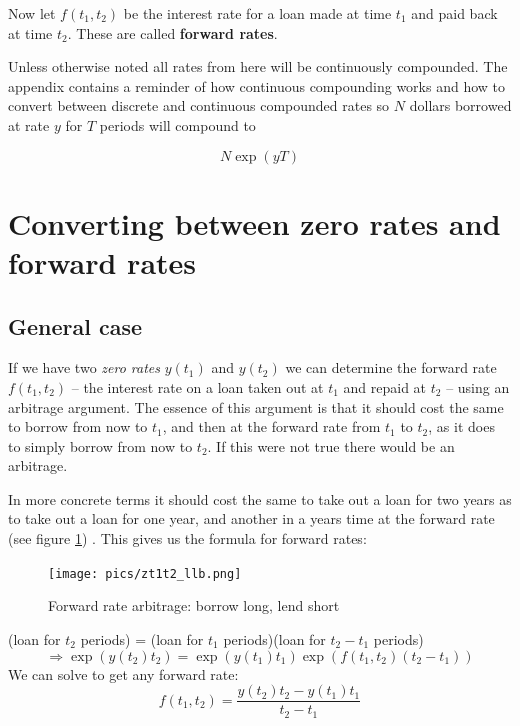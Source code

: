 \documentclass{tran-l}
\theoremstyle{definition}
\theoremstyle{remark}
\numberwithin{equation}{subsection}
\begin{document}
Now let $f(t_1,t_2)$ be the interest rate for a loan made at time $t_1$ and paid back at time $t_2$. These are called \textbf{forward rates}.

Unless otherwise noted all rates from here will be continuously compounded. The appendix contains a reminder of how continuous compounding works and how to convert between discrete and continuous compounded rates so $N$ dollars borrowed at rate $y$ for $T$ periods will compound to

\[N\exp (yT) \]


\section{Converting between zero rates and forward rates}


\subsection{General case}

If we have two \textit{zero rates} $y(t_1)$ and $y(t_2)$ we can determine the forward rate $f(t_1,t_2)$ -- the interest rate on a loan taken out at $t_1$ and repaid at $t_2$ -- using an arbitrage argument. The essence of this argument is that it should cost the same to borrow from now to $t_1$, and then at the forward rate from $t_1$ to $t_2$, as it does to simply borrow from now to $t_2$. If this were not true there would be an arbitrage.

In more concrete terms it should cost the same to take out a loan for two years as to take out a loan for one year, and another in a years time at the forward rate (see figure \ref{frArb}) . This gives us the formula for forward rates:

\begin{figure}[htbp]
\begin{center}
  \texttt{[image: pics/zt1t2\_llb.png]} \\
  \caption{Forward rate arbitrage: borrow long, lend short}
\label{frArb}
\end{center}
\end{figure}


\begin{center}
(loan for $t_2$ periods)  = (loan for $t_1$ periods)(loan for $t_2-t_1$ periods)
\[\Rightarrow \exp(y(t_2)t_2) = \exp(y(t_1)t_1)\exp(f(t_1,t_2)(t_2-t_1)) \]
We can solve to get any forward rate:
\begin{equation}f(t_1,t_2) = \frac{y(t_2)t_2-y(t_1)t_1}{t_2-t_1}  \label{fRates}\end{equation}
\end{center}
\end{document}
